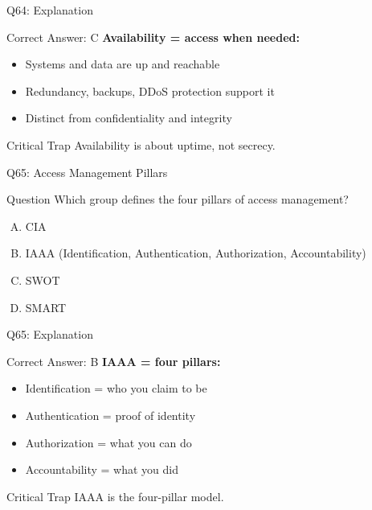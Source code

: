 \documentclass{beamer}
\begin{document}
	\begin{frame}{Q64: Explanation}
		\begin{block}{Correct Answer: C}
			\textbf{Availability = access when needed:}
			\begin{itemize}
				\item Systems and data are up and reachable
				\item Redundancy, backups, DDoS protection support it
				\item Distinct from confidentiality and integrity
			\end{itemize}
		\end{block}
		\begin{alertblock}{Critical Trap}
			Availability is about uptime, not secrecy.
		\end{alertblock}
	\end{frame}
	
	\begin{frame}{Q65: Access Management Pillars}
		\begin{block}{Question}
			Which group defines the four pillars of access management?
		\end{block}
		\begin{enumerate}[(A)]
			\item CIA
			\item IAAA (Identification, Authentication, Authorization, Accountability)
			\item SWOT
			\item SMART
		\end{enumerate}
	\end{frame}
	
	\begin{frame}{Q65: Explanation}
		\begin{block}{Correct Answer: B}
			\textbf{IAAA = four pillars:}
			\begin{itemize}
				\item Identification = who you claim to be
				\item Authentication = proof of identity
				\item Authorization = what you can do
				\item Accountability = what you did
			\end{itemize}
		\end{block}
		\begin{alertblock}{Critical Trap}
			IAAA is the four-pillar model.
		\end{alertblock}
	\end{frame}
	
\end{document}
